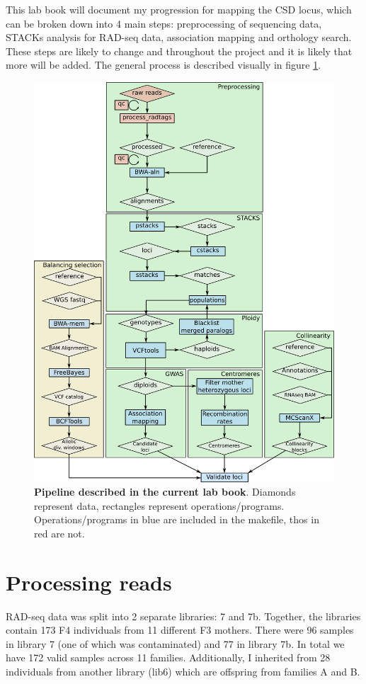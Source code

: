 \documentclass[10pt,a4paper]{report}
\begin{document}
This lab book will document my progression for mapping the CSD locus, which can be broken down into 4 main steps: preprocessing of sequencing data, STACKs analysis for RAD-seq data, association mapping and orthology search. These steps are likely to change and throughout the project and it is likely that more will be added. The general process is described visually in figure \ref{pipeline}.
\begin{figure}
\includegraphics[scale=0.5]{flowchart}
\caption{\textbf{Pipeline described in the current lab book}. Diamonds represent data, rectangles represent operations/programs. Operations/programs in blue are included in the makefile, thos in red are not.}
\label{pipeline}
\end{figure}

 \chapter{Processing reads}
 RAD-seq data was split into 2 separate libraries: 7 and 7b. Together, the libraries contain 173 F4 individuals from 11 different F3 mothers. There were 96 samples in library 7 (one of which was contaminated) and 77 in library 7b. In total we have 172 valid samples across 11 families. Additionally, I inherited from 28 individuals from another library (lib6) which are offspring from families A and B.
\end{document}
